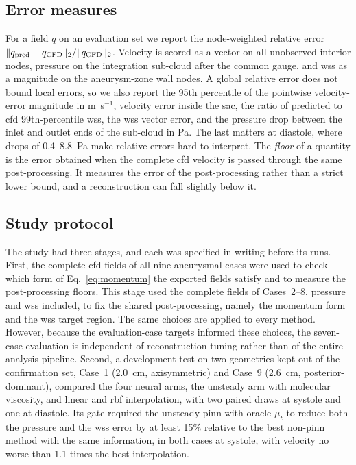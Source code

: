 \documentclass[12pt,a4paper]{article}
\newcommand{\CFD}{\ac{cfd}\xspace}
\newcommand{\PINN}{\ac{pinn}\xspace}
\newcommand{\WSS}{\ac{wss}\xspace}
\newcommand{\RBF}{\ac{rbf}\xspace}
\theoremstyle{definition}
\numberwithin{equation}{section}
\begin{document}
\subsection{Error measures}
\label{sec:metrics}
For a field $q$ on an evaluation set we report the node-weighted relative error $\|q_{\rm pred}-q_{\rm CFD}\|_2/\|q_{\rm CFD}\|_2$. Velocity is scored as a vector on all unobserved interior nodes, pressure on the integration sub-cloud after the common gauge, and \WSS as a magnitude on the aneurysm-zone wall nodes. A global relative error does not bound local errors, so we also report the 95th percentile of the pointwise velocity-error magnitude in m~s$^{-1}$, velocity error inside the sac, the ratio of predicted to \CFD 99th-percentile \WSS, the \WSS vector error, and the pressure drop between the inlet and outlet ends of the sub-cloud in Pa. The last matters at diastole, where drops of 0.4--8.8~Pa make relative errors hard to interpret. The \emph{floor} of a quantity is the error obtained when the complete \CFD velocity is passed through the same post-processing. It measures the error of the post-processing rather than a strict lower bound, and a reconstruction can fall slightly below it.

\subsection{Study protocol}
\label{sec:protocol}
The study had three stages, and each was specified in writing before its runs. First, the complete \CFD fields of all nine aneurysmal cases were used to check which form of Eq.~\eqref{eq:momentum} the exported fields satisfy and to measure the post-processing floors. This stage used the complete fields of Cases~2--8, pressure and \WSS included, to fix the shared post-processing, namely the momentum form and the \WSS target region. The same choices are applied to every method. However, because the evaluation-case targets informed these choices, the seven-case evaluation is independent of reconstruction tuning rather than of the entire analysis pipeline. Second, a development test on two geometries kept out of the confirmation set, Case~1 (2.0~cm, axisymmetric) and Case~9 (2.6~cm, posterior-dominant), compared the four neural arms, the unsteady arm with molecular viscosity, and linear and \RBF interpolation, with two paired draws at systole and one at diastole. Its gate required the unsteady \PINN with oracle $\mu_t$ to reduce both the pressure and the \WSS error by at least 15\% relative to the best non-\PINN method with the same information, in both cases at systole, with velocity no worse than 1.1 times the best interpolation.
\end{document}
